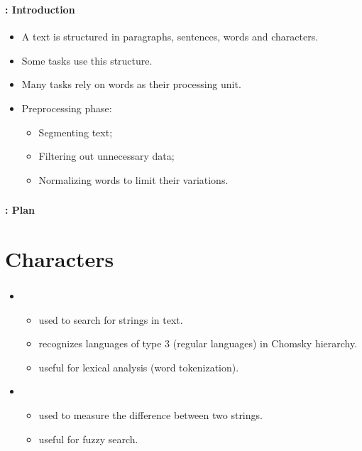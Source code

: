 \documentclass[xcolor=table]{beamer}
\subtitle[03- Basic text processing]{Chapter 03\\Basic text processing}
\begin{document}
	
\begin{frame}
	\frametitle{\inserttitle}
	\framesubtitle{\insertshortsubtitle: Introduction}
	
	\begin{itemize}
		\item A text is structured in paragraphs, sentences, words and characters.
		\item Some tasks use this structure.
		\item Many tasks rely on words as their processing unit.
		\item Preprocessing phase:
		\begin{itemize}
			\item Segmenting text;
			\item Filtering out unnecessary data;
			\item Normalizing words to limit their variations.
		\end{itemize}
	\end{itemize}

\end{frame}


\begin{frame}
	\frametitle{\inserttitle}
	\framesubtitle{\insertshortsubtitle: Plan}
	
	\begin{multicols}{2}
	\tableofcontents
	\end{multicols}
\end{frame}

\section{Characters}

\begin{frame}
	\frametitle{\insertshortsubtitle}
	\framesubtitle{\insertsection}

	\begin{itemize}
		\item {}
		\begin{itemize}
			\item used to search for strings in text.
			\item recognizes languages of type 3 (regular languages) in Chomsky hierarchy.
			\item useful for lexical analysis (word tokenization).
		\end{itemize}
		\item {}
		\begin{itemize}
			\item used to measure the difference between two strings.
			\item useful for fuzzy search.
		\end{itemize}
	\end{itemize}

\end{frame}
\end{document}

